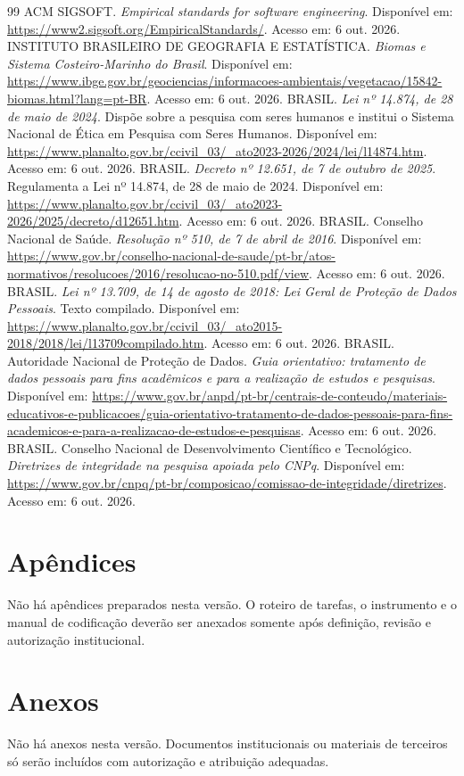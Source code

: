 \documentclass[12pt,oneside,a4paper,brazil]{abntex2}
\begin{document}
\postextual
\begin{thebibliography}{99}
 ACM SIGSOFT. \textit{Empirical standards for software engineering}. Disponível em: \url{https://www2.sigsoft.org/EmpiricalStandards/}. Acesso em: 6 out. 2026.
 INSTITUTO BRASILEIRO DE GEOGRAFIA E ESTATÍSTICA. \textit{Biomas e Sistema Costeiro-Marinho do Brasil}. Disponível em: \url{https://www.ibge.gov.br/geociencias/informacoes-ambientais/vegetacao/15842-biomas.html?lang=pt-BR}. Acesso em: 6 out. 2026.
 BRASIL. \textit{Lei nº 14.874, de 28 de maio de 2024}. Dispõe sobre a pesquisa com seres humanos e institui o Sistema Nacional de Ética em Pesquisa com Seres Humanos. Disponível em: \url{https://www.planalto.gov.br/ccivil_03/_ato2023-2026/2024/lei/l14874.htm}. Acesso em: 6 out. 2026.
 BRASIL. \textit{Decreto nº 12.651, de 7 de outubro de 2025}. Regulamenta a Lei nº 14.874, de 28 de maio de 2024. Disponível em: \url{https://www.planalto.gov.br/ccivil_03/_ato2023-2026/2025/decreto/d12651.htm}. Acesso em: 6 out. 2026.
 BRASIL. Conselho Nacional de Saúde. \textit{Resolução nº 510, de 7 de abril de 2016}. Disponível em: \url{https://www.gov.br/conselho-nacional-de-saude/pt-br/atos-normativos/resolucoes/2016/resolucao-no-510.pdf/view}. Acesso em: 6 out. 2026.
 BRASIL. \textit{Lei nº 13.709, de 14 de agosto de 2018: Lei Geral de Proteção de Dados Pessoais}. Texto compilado. Disponível em: \url{https://www.planalto.gov.br/ccivil_03/_ato2015-2018/2018/lei/l13709compilado.htm}. Acesso em: 6 out. 2026.
 BRASIL. Autoridade Nacional de Proteção de Dados. \textit{Guia orientativo: tratamento de dados pessoais para fins acadêmicos e para a realização de estudos e pesquisas}. Disponível em: \url{https://www.gov.br/anpd/pt-br/centrais-de-conteudo/materiais-educativos-e-publicacoes/guia-orientativo-tratamento-de-dados-pessoais-para-fins-academicos-e-para-a-realizacao-de-estudos-e-pesquisas}. Acesso em: 6 out. 2026.
 BRASIL. Conselho Nacional de Desenvolvimento Científico e Tecnológico. \textit{Diretrizes de integridade na pesquisa apoiada pelo CNPq}. Disponível em: \url{https://www.gov.br/cnpq/pt-br/composicao/comissao-de-integridade/diretrizes}. Acesso em: 6 out. 2026.
\end{thebibliography}
\chapter*{Apêndices}
Não há apêndices preparados nesta versão. O roteiro de tarefas, o instrumento e o manual de codificação deverão ser anexados somente após definição, revisão e autorização institucional.
\chapter*{Anexos}
Não há anexos nesta versão. Documentos institucionais ou materiais de terceiros só serão incluídos com autorização e atribuição adequadas.
\end{document}
